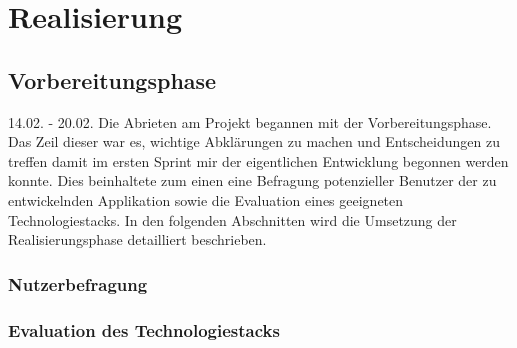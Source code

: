 \chapter{Realisierung}

\section{Vorbereitungsphase}
14.02. - 20.02.
Die Abrieten am Projekt begannen mit der Vorbereitungsphase. Das Zeil dieser war es, wichtige Abklärungen zu machen und Entscheidungen zu treffen damit im ersten Sprint mir der eigentlichen Entwicklung begonnen werden konnte.
Dies beinhaltete zum einen eine Befragung potenzieller Benutzer der zu entwickelnden Applikation sowie die Evaluation eines geeigneten Technologiestacks. In den folgenden Abschnitten wird die Umsetzung der Realisierungsphase detailliert beschrieben.

\subsection{Nutzerbefragung}



\subsection{Evaluation des Technologiestacks}


\newpage